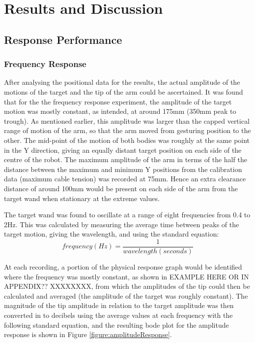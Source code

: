 \documentclass[11pt]{article}
\begin{document}
\pagebreak
{}
\section{Results and Discussion}
\subsection{Response Performance}
\subsubsection{Frequency Response}

After analysing the positional data for the results, the actual amplitude of the motions of the target and the tip of the arm could be ascertained. It was found that for the the frequency response experiment, the amplitude of the target motion was mostly constant, as intended, at around 175mm (350mm peak to trough). As mentioned earlier, this amplitude was larger than the capped vertical range of motion of the arm, so that the arm moved from gesturing position to the other. The mid-point of the motion of both bodies was roughly at the same point in the Y direction, giving an equally distant target position on each side of the centre of the robot. The maximum amplitude of the arm in terms of the half the distance between the maximum and minimum Y positions from the calibration data (maximum cable tension) was recorded at 75mm. Hence an extra clearance distance of around 100mm would be present on each side of the arm from the target wand when stationary at the extreme values. 

The target wand was found to oscillate at a range of eight frequencies from 0.4 to 2Hz. This was calculated by measuring the average time between peaks of the target motion, giving the wavelength, and using the standard equation:
\begin{equation}
frequency(Hz) = \frac{1}{wavelength(seconds)}
\end{equation}

At each recording, a portion of the physical response graph would be identified where the frequency was mostly constant, as shown in EXAMPLE HERE OR IN APPENDIX?? XXXXXXXX, from which the amplitudes of the tip could then be calculated and averaged (the amplitude of the target was roughly constant). The magnitude of the tip amplitude in relation to the target amplitude was then converted in to decibels using the average values at each frequency with the following standard equation, and the resulting bode plot for the amplitude response is shown in Figure \ref{figure:amplitudeResponse}.
\end{document}
